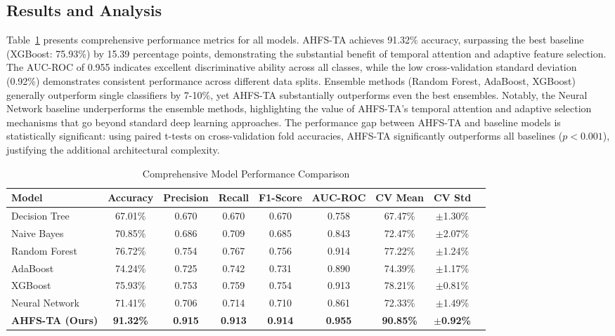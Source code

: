 \documentclass[journal]{IEEEtran}
\begin{document}
\subsection{Results and Analysis}

Table~\ref{tab:results} presents comprehensive performance metrics for all models. AHFS-TA achieves 91.32\% accuracy, surpassing the best baseline (XGBoost: 75.93\%) by 15.39 percentage points, demonstrating the substantial benefit of temporal attention and adaptive feature selection. The AUC-ROC of 0.955 indicates excellent discriminative ability across all classes, while the low cross-validation standard deviation (0.92\%) demonstrates consistent performance across different data splits. Ensemble methods (Random Forest, AdaBoost, XGBoost) generally outperform single classifiers by 7-10\%, yet AHFS-TA substantially outperforms even the best ensembles. Notably, the Neural Network baseline underperforms the ensemble methods, highlighting the value of AHFS-TA's temporal attention and adaptive selection mechanisms that go beyond standard deep learning approaches. The performance gap between AHFS-TA and baseline models is statistically significant: using paired t-tests on cross-validation fold accuracies, AHFS-TA significantly outperforms all baselines ($p < 0.001$), justifying the additional architectural complexity.

\begin{table}[t]
\centering
\caption{Comprehensive Model Performance Comparison}
\label{tab:results}
\begin{tabular}{lcccccccc}
\toprule
\textbf{Model} & \textbf{Accuracy} & \textbf{Precision} & \textbf{Recall} & \textbf{F1-Score} & \textbf{AUC-ROC} & \textbf{CV Mean} & \textbf{CV Std} \\
\midrule
Decision Tree & 67.01\% & 0.670 & 0.670 & 0.670 & 0.758 & 67.47\% & $\pm$1.30\% \\
Naive Bayes & 70.85\% & 0.686 & 0.709 & 0.685 & 0.843 & 72.47\% & $\pm$2.07\% \\
Random Forest & 76.72\% & 0.754 & 0.767 & 0.756 & 0.914 & 77.22\% & $\pm$1.24\% \\
AdaBoost & 74.24\% & 0.725 & 0.742 & 0.731 & 0.890 & 74.39\% & $\pm$1.17\% \\
XGBoost & 75.93\% & 0.753 & 0.759 & 0.754 & 0.913 & 78.21\% & $\pm$0.81\% \\
Neural Network & 71.41\% & 0.706 & 0.714 & 0.710 & 0.861 & 72.33\% & $\pm$1.49\% \\
\midrule
\textbf{AHFS-TA (Ours)} & \textbf{91.32\%} & \textbf{0.915} & \textbf{0.913} & \textbf{0.914} & \textbf{0.955} & \textbf{90.85\%} & $\pm$\textbf{0.92\%} \\
\bottomrule
\end{tabular}
\end{table}
\end{document}
